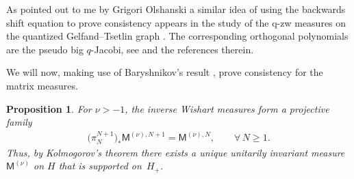 \documentclass[11pt]{article}
\numberwithin{equation}{section}
\newtheorem{Proposition}[Theorem]{Proposition}
{ \theoremstyle{definition}
\newtheorem{Definition}[Theorem]{Definition}
\newtheorem{Remark}[Theorem]{Remark} }
\begin{document}
\begin{Remark}
As pointed out to me by Grigori Olshanski a similar idea of using the backwards shift equation to prove consistency appears in the study of the q-zw measures on the quantized Gelfand--Tsetlin graph \cite{GorinOlshanski}. The corresponding orthogonal polynomials are the pseudo big $q$-Jacobi, see \cite{GorinOlshanski} and the references therein.
\end{Remark}

We will now, making use of Baryshnikov's result \cite{Baryshnikov}, prove consistency for the matrix measures.

\begin{Proposition}\label{consistencymatrices}For $\nu>-1$, the inverse Wishart measures form a projective family
\begin{gather*}
\big(\pi_{N}^{N+1}\big)_*\mathsf{M}^{(\nu),N+1}=\mathsf{M}^{(\nu),N}, \qquad \forall\, N\ge 1.
\end{gather*}
Thus, by Kolmogorov's theorem there exists a unique unitarily invariant measure $\mathsf{M}^{(\nu)}$ on $H$ that is supported on~$H_{+}$.
\end{Proposition}
\end{document}
